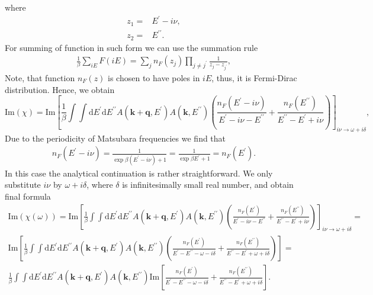 \documentclass[preprint,prb,amsmath,superscriptaddress,showpacs]{revtex4}
\begin{document}
%
 where
%
 \begin{align*}
    z_1 =& E^{\prime} - i\nu, \\
    z_2 =& E^{\prime \prime}.
 \end{align*}
%
For summing of function in such form we can use the summation rule
 \begin{align}
     \frac{1}{\beta} \sum_{iE} F(iE) = \sum_j n_F(z_j) \prod\limits_{j\neq j^{\prime}} \frac{1}{z_j - z_{j^{\prime}}},
 \end{align}
Note, that function $n_F(z)$ is chosen to have poles in $iE$, thus, it is
Fermi-Dirac distribution. Hence, we obtain
%
\begin{equation}
       \mathrm{Im} (\chi) =  \mathrm{Im}\left[ \frac{1}{\beta} \int \int
      \mathrm{d}E^{\prime} \mathrm{d}E^{\prime \prime} A(\mathbf{k} +
      \mathbf{q}, E^{\prime}) A(\mathbf{k}, E^{\prime \prime}) \left(
        \frac{n_F(E^{\prime} - i\nu)}{E^{\prime} - i\nu - E^{\prime
            \prime}} +  \frac{n_F(E^{\prime \prime})}{E^{\prime
            \prime} - E^{\prime} + i\nu}  \right)
  \right]_{i\nu \rightarrow \omega + i\delta},
\end{equation}
%
Due to the periodicity of Matsubara frequencies we find that
%
\begin{align*}
    n_F(E^{\prime} - i\nu) = \frac{1}{\exp{\beta (E^{\prime} - i\nu)} + 1} = \frac{1}{\exp{\beta E^{\prime}} + 1} = n_F(E^{\prime}).
\end{align*}
%
In this case the analytical continuation is rather straightforward. We only substitute $i\nu$ by $ \omega + i\delta$, where $\delta$ is infinitesimally small real number, and obtain final formula 
%
\begin{equation}
    \begin{gathered}
    \mathrm{Im} (\chi(\omega)) = \mathrm{Im}\left[ \frac{1}{\beta} \int \int
      \mathrm{d}E^{\prime} \mathrm{d}E^{\prime \prime} A(\mathbf{k} +
      \mathbf{q}, E^{\prime}) A(\mathbf{k}, E^{\prime \prime}) \left(
        \frac{n_F(E^{\prime})}{E^{\prime} - i\nu - E^{\prime
            \prime}} +  \frac{n_F(E^{\prime \prime})}{E^{\prime
            \prime} - E^{\prime} + i\nu}  \right) \right]_{i\nu \rightarrow \omega + i\delta}  = \\
    \mathrm{Im}\left[ \frac{1}{\beta} \int \int
      \mathrm{d}E^{\prime} \mathrm{d}E^{\prime \prime} A(\mathbf{k} +
      \mathbf{q}, E^{\prime}) A(\mathbf{k}, E^{\prime \prime}) \left(
        \frac{n_F(E^{\prime})}{E^{\prime} - E^{\prime \prime} - \omega - i\delta} +  \frac{n_F(E^{\prime \prime})}{E^{\prime
            \prime} - E^{\prime} + \omega +  i\delta}  \right)
    \right] = \\
     \frac{1}{\beta} \int \int
      \mathrm{d}E^{\prime} \mathrm{d}E^{\prime \prime} A(\mathbf{k} +
      \mathbf{q}, E^{\prime}) A(\mathbf{k}, E^{\prime \prime})  \mathrm{Im}\left[
        \frac{n_F(E^{\prime})}{E^{\prime} - E^{\prime \prime} - \omega - i\delta} +  \frac{n_F(E^{\prime \prime})}{E^{\prime
            \prime} - E^{\prime} + \omega +  i\delta} \right].
    \end{gathered}
\end{equation}
\end{document}
